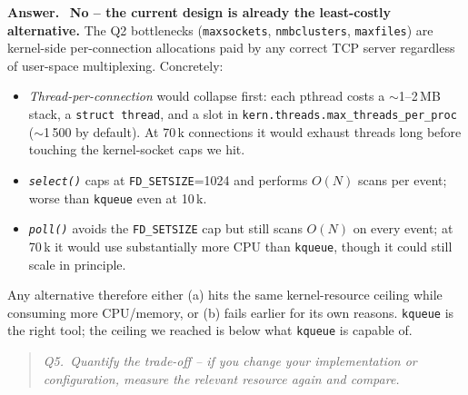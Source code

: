 \documentclass[11pt,a4paper]{article}
\newcommand{\qbox}[1]{%
  \begin{quote}\itshape #1\end{quote}%
}
\newenvironment{answer}
  {\begin{answerbox}\textbf{\color{accent}Answer.}\ }
  {\end{answerbox}}
\begin{document}
\begin{answer}
\textbf{No -- the current design is already the least-costly alternative.}
The Q2 bottlenecks (\texttt{maxsockets}, \texttt{nmbclusters},
\texttt{maxfiles}) are kernel-side per-connection allocations paid by any
correct TCP server regardless of user-space multiplexing.  Concretely:
\begin{itemize}[leftmargin=1.5em,itemsep=0.15em]
  \item \emph{Thread-per-connection} would collapse first: each pthread
        costs a $\sim$1--2\,MB stack, a \texttt{struct thread}, and a slot
        in \texttt{kern.threads.max\_threads\_per\_proc} ($\sim$1\,500 by
        default).  At 70\,k connections it would exhaust threads long
        before touching the kernel-socket caps we hit.
  \item \emph{\texttt{select()}} caps at \texttt{FD\_SETSIZE}=1024 and
        performs $O(N)$ scans per event; worse than \texttt{kqueue} even
        at 10\,k.
  \item \emph{\texttt{poll()}} avoids the \texttt{FD\_SETSIZE} cap but still
        scans $O(N)$ on every event; at 70\,k it would use substantially
        more CPU than \texttt{kqueue}, though it could still scale in
        principle.
\end{itemize}
Any alternative therefore either (a) hits the same kernel-resource ceiling
while consuming more CPU/memory, or (b) fails earlier for its own reasons.
\texttt{kqueue} is the right tool; the ceiling we reached is below what
\texttt{kqueue} is capable of.
\end{answer}

\qbox{Q5.\ Quantify the trade-off -- if you change your implementation or
configuration, measure the relevant resource again and compare.}
\end{document}
